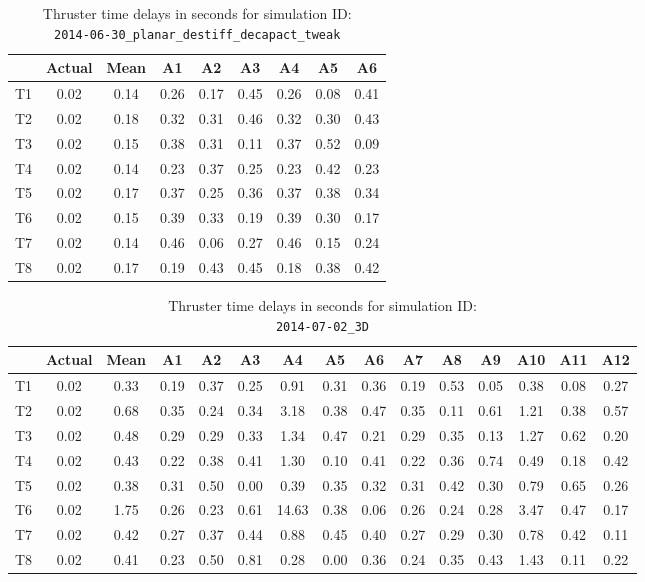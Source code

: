 \begin{table}[H]
\centering
\cprotect\caption{Thruster time delays in seconds for simulation ID:\\
\verb|2014-06-30_planar_destiff_decapact_tweak|}
\begin{tabular}{|c|c|c|c|c|c|c|c|c|} \hline
~ & Actual & Mean & A1 & A2 & A3 & A4 & A5 & A6 \\ \hline
T1 & 0.02 & 0.14 & 0.26 & 0.17 & 0.45 & 0.26 & 0.08 & 0.41 \\
T2 & 0.02 & 0.18 & 0.32 & 0.31 & 0.46 & 0.32 & 0.30 & 0.43 \\
T3 & 0.02 & 0.15 & 0.38 & 0.31 & 0.11 & 0.37 & 0.52 & 0.09 \\
T4 & 0.02 & 0.14 & 0.23 & 0.37 & 0.25 & 0.23 & 0.42 & 0.23 \\
T5 & 0.02 & 0.17 & 0.37 & 0.25 & 0.36 & 0.37 & 0.38 & 0.34 \\
T6 & 0.02 & 0.15 & 0.39 & 0.33 & 0.19 & 0.39 & 0.30 & 0.17 \\
T7 & 0.02 & 0.14 & 0.46 & 0.06 & 0.27 & 0.46 & 0.15 & 0.24 \\
T8 & 0.02 & 0.17 & 0.19 & 0.43 & 0.45 & 0.18 & 0.38 & 0.42 \\ \hline
\end{tabular}
\label{delay-4}
\end{table}

\begin{table}[H]
\centering
\cprotect\caption{Thruster time delays in seconds for simulation ID:\\
\verb|2014-07-02_3D|}
\begin{tabular}{|c|c|c|c|c|c|c|c|c|c|c|c|c|c|c|} \hline
~ & Actual & Mean & A1 & A2 & A3 & A4 & A5 & A6 & A7 & A8 & A9 & A10 & A11 & A12 \\ \hline
T1 & 0.02 & 0.33 & 0.19 & 0.37 & 0.25 & 0.91 & 0.31 & 0.36 & 0.19 & 0.53 & 0.05 & 0.38 & 0.08 & 0.27 \\
T2 & 0.02 & 0.68 & 0.35 & 0.24 & 0.34 & 3.18 & 0.38 & 0.47 & 0.35 & 0.11 & 0.61 & 1.21 & 0.38 & 0.57 \\
T3 & 0.02 & 0.48 & 0.29 & 0.29 & 0.33 & 1.34 & 0.47 & 0.21 & 0.29 & 0.35 & 0.13 & 1.27 & 0.62 & 0.20 \\
T4 & 0.02 & 0.43 & 0.22 & 0.38 & 0.41 & 1.30 & 0.10 & 0.41 & 0.22 & 0.36 & 0.74 & 0.49 & 0.18 & 0.42 \\
T5 & 0.02 & 0.38 & 0.31 & 0.50 & 0.00 & 0.39 & 0.35 & 0.32 & 0.31 & 0.42 & 0.30 & 0.79 & 0.65 & 0.26 \\
T6 & 0.02 & 1.75 & 0.26 & 0.23 & 0.61 & 14.63 & 0.38 & 0.06 & 0.26 & 0.24 & 0.28 & 3.47 & 0.47 & 0.17 \\
T7 & 0.02 & 0.42 & 0.27 & 0.37 & 0.44 & 0.88 & 0.45 & 0.40 & 0.27 & 0.29 & 0.30 & 0.78 & 0.42 & 0.11 \\
T8 & 0.02 & 0.41 & 0.23 & 0.50 & 0.81 & 0.28 & 0.00 & 0.36 & 0.24 & 0.35 & 0.43 & 1.43 & 0.11 & 0.22 \\ \hline
\end{tabular}
\label{delay-5}
\end{table}

